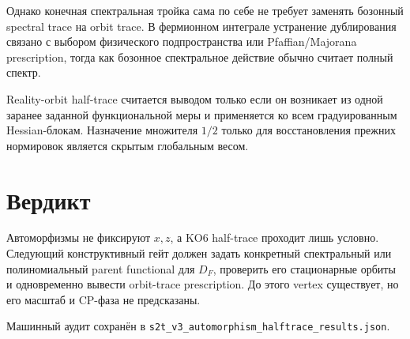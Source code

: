 Однако конечная спектральная тройка сама по себе не требует заменять
бозонный spectral trace на orbit trace. В фермионном интеграле устранение
дублирования связано с выбором физического подпространства или
Pfaffian/Majorana prescription, тогда как бозонное спектральное действие
обычно считает полный спектр.

\begin{nogocriterion}
Reality-orbit half-trace считается выводом только если он возникает из
одной заранее заданной функциональной меры и применяется ко всем
градуированным Hessian-блокам. Назначение множителя \(1/2\) только для
восстановления прежних нормировок является скрытым глобальным весом.
\end{nogocriterion}

\section{Вердикт}

Автоморфизмы не фиксируют \(x,z\), а KO6 half-trace проходит лишь
условно. Следующий конструктивный гейт должен задать конкретный
спектральный или полиномиальный parent functional для \(D_F\), проверить
его стационарные орбиты и одновременно вывести orbit-trace prescription.
До этого vertex существует, но его масштаб и CP-фаза не предсказаны.

Машинный аудит сохранён в
\texttt{s2t\_v3\_automorphism\_halftrace\_results.json}.